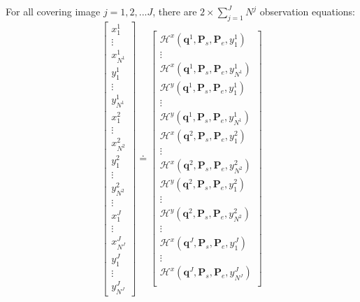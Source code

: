 For all covering image $j=1,2,...J$, there are $2\times\displaystyle\sum_{j=1}^{J}N^j$ observation equations:
\begin{equation} \label{eq:obs-camera1}
\begin{bmatrix}
 x^1_1\\
 \vdots\\
 x^1_{N^1}\\
 y^1_1\\
 \vdots\\
 y^1_{N^1}\\
 x^2_1\\
 \vdots\\
 x^2_{N^2}\\
 y^2_1\\
 \vdots\\
 y^2_{N^2}\\
 \vdots\\
 x^J_1\\
 \vdots\\
 x^J_{N^J}\\
 y^J_1\\
 \vdots\\
 y^J_{N^J}
\end{bmatrix}
\doteq %
\begin{bmatrix}
 \mathcal{H}^x(\mathbf{q}^1,\mathbf{P}_s,\mathbf{P}_e,y^1_1)\\
 \vdots\\
 \mathcal{H}^x(\mathbf{q}^1,\mathbf{P}_s,\mathbf{P}_e,y^1_{N^1})\\
 \mathcal{H}^y(\mathbf{q}^1,\mathbf{P}_s,\mathbf{P}_e,y^1_1)\\
 \vdots\\
 \mathcal{H}^y(\mathbf{q}^1,\mathbf{P}_s,\mathbf{P}_e,y^1_{N^1})\\
 \mathcal{H}^x(\mathbf{q}^2,\mathbf{P}_s,\mathbf{P}_e,y^2_1)\\
 \vdots\\
 \mathcal{H}^x(\mathbf{q}^2,\mathbf{P}_s,\mathbf{P}_e,y^2_{N^2})\\
 \mathcal{H}^y(\mathbf{q}^2,\mathbf{P}_s,\mathbf{P}_e,y^2_1)\\
 \vdots\\
 \mathcal{H}^y(\mathbf{q}^2,\mathbf{P}_s,\mathbf{P}_e,y^2_{N^2})\\
 \vdots\\
 \mathcal{H}^x(\mathbf{q}^J,\mathbf{P}_s,\mathbf{P}_e,y^J_1)\\
 \vdots\\
 \mathcal{H}^x(\mathbf{q}^J,\mathbf{P}_s,\mathbf{P}_e,y^J_{N^J})\\

\end{bmatrix}
\end{equation}
